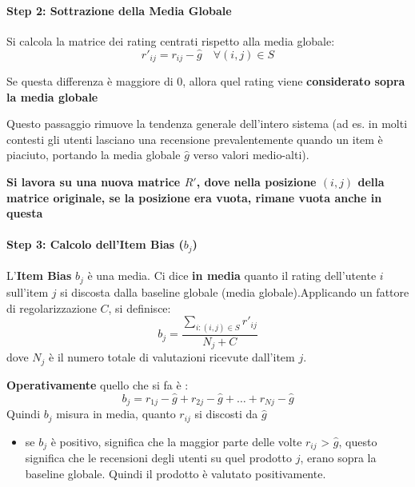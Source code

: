 \paragraph{Step 2: Sottrazione della Media Globale}
Si calcola la matrice dei rating centrati rispetto alla media globale:
\[
r'_{ij} = r_{ij} - \hat{g} \quad \forall (i,j) \in S
\]

Se questa differenza è maggiore di 0, allora quel rating viene \textbf{considerato sopra la media globale}

Questo passaggio rimuove la tendenza generale dell'intero sistema (ad es. in molti contesti gli utenti lasciano una recensione prevalentemente quando un item è piaciuto, portando la media globale $\hat{g}$ verso valori medio-alti).

\textbf{Si lavora su una nuova matrice $R'$, dove nella posizione $(i,j)$ della matrice originale, se la posizione era vuota, rimane vuota anche in questa}

\paragraph{Step 3: Calcolo dell'Item Bias ($b_j$)}
L'\textbf{Item Bias} $b_j$ è una media. Ci dice \textbf{in media} quanto il rating dell'utente $i$ sull'item $j$ si discosta dalla baseline globale (media globale).Applicando un fattore di regolarizzazione $C$, si definisce:
\[
b_j = \frac{\sum_{i: (i,j) \in S} r'_{ij}}{N_j + C}
\]
dove $N_j$ è il numero totale di valutazioni ricevute dall'item $j$.

\textbf{Operativamente} quello che si fa è :
\begin{equation}
    b_j = r_{1j}-\hat{g} + r_{2j}-\hat{g} + \dots + r_{Nj} - \hat{g}
\end{equation}
Quindi $b_j$ misura in media, quanto $r_{ij}$ si discosti da $\hat{g}$

\begin{itemize}
    \item se $b_j$ è positivo, significa che la maggior parte delle volte $r_{ij}$ > $\hat{g}$, questo significa che le recensioni degli utenti su quel prodotto $j$, erano sopra la baseline globale.
    Quindi il prodotto è valutato positivamente.
\end{itemize}



